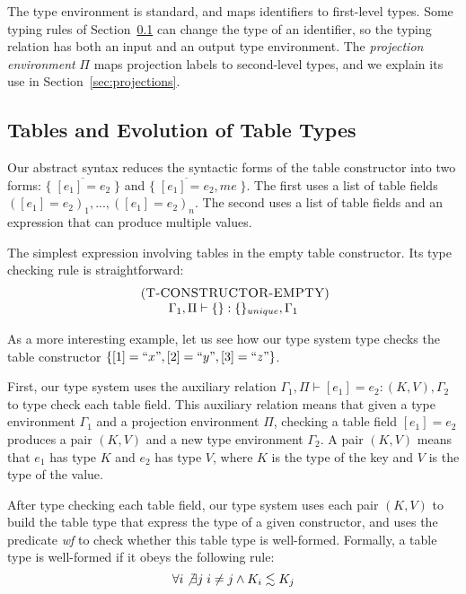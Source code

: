 \documentclass{sigplanconf}
\newcommand{\mylabel}[1]{\; (\textsc{#1})}
\newcommand{\env}{\Gamma}
\newcommand{\penv}{\Pi}
\begin{document}
The type environment is standard, and maps
identifiers to first-level types. Some typing rules of
Section~\ref{sec:tables} can change the type of an identifier,
so the typing relation has both an input and an output type
environment. The {\em projection environment} $\Pi$ maps projection labels to second-level types, and we explain
its use in Section~\ref{sec:projections}.

\subsection{Tables and Evolution of Table Types}
\label{sec:tables}

Our abstract syntax reduces the syntactic forms of the table constructor
into two forms: $\{\;\overline{[e_{1}] = e_{2}}\;\}$ and
$\{\;\overline{[e_{1}] = e_{2}},me\;\}$.
The first uses a list of table fields $([e_{1}] = e_{2})_{1}, ..., ([e_{1}] = e_{2})_{n}$.
The second uses a list of table fields and an expression that can
produce multiple values.

The simplest expression involving tables in the empty table constructor.
Its type checking rule is straightforward:
\[
\begin{array}{c}
\mylabel{T-CONSTRUCTOR-EMPTY}\\
\env_{1}, \penv \vdash \{\}:\{\}_{unique}, \env_{1}
\end{array}
\]

As a more interesting example, let us see how our type system type checks
the table constructor $\{ [1] = ``x", [2] = ``y", [3] = ``z" \}$.

First, our type system uses the auxiliary relation
$\env_{1}, \penv \vdash [e_{1}] = e_{2} : (K,V), \env_{2}$ to type check each
table field.
This auxiliary relation means that given a type environment $\env_{1}$
and a projection environment $\penv$, checking a table field $[e_{1}] = e_{2}$
produces a pair $(K,V)$ and a new type environment $\env_{2}$.
A pair $(K,V)$ means that $e_{1}$ has type $K$ and $e_{2}$ has type $V$,
where $K$ is the type of the key and $V$ is the type of the value.

After type checking each table field, our type system uses each pair $(K,V)$
to build the table type that express the type of a given constructor, and
uses the predicate \emph{wf} to check whether this table type is well-formed.
Formally, a table type is well-formed if it obeys the following rule:
\[
\forall i \not\exists j \; i \not= j \wedge K_{i} \lesssim K_{j}
\]
\end{document}

